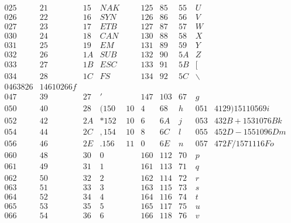 $$\begin{array}{|lllll||llll|l}
       025&   21&    15&    NAK&     &       125&   85&    55&    U& \\
       026&   22&    16&    SYN&     &       126&   86&    56&    V& \\
       027&   23&    17&    ETB&     &       127&   87&    57&    W& \\
       030&   24&    18&    CAN&     &       130&   88&    58&    X& \\
       031&   25&    19&    EM&     &        131&   89&    59&    Y& \\
       032&   26&    1A&    SUB&     &       132&   90&    5A&    Z& \\
       033&   27&    1B&    ESC&     &       133&   91&    5B&    [ \\
       034&   28&     1C&    FS&     &        134&   92&    5C&    \backslash \\
	\hline
       046    38     26    &              146   102   66    f \\
       047&   39&    27&    '&     &         147&   103&   67&    g& \\
       050&   40&    28&    (              150&   10&4&   68&    h&
       051&   41    29    )              151   105   69    i \\
       052&   42&    2A&    *              152&   10&6&   6A&    j&
       053&   43    2B    +              153   107   6B    k \\
       054&   44&    2C&    ,              154&   10&8&   6C&    l&
       055&   45    2D    -              155   109   6D    m \\
       056&   46&    2E&    .              156&   11&0&   6E&    n&
       057&   47    2F    /              157   111   6F    o \\
       060&   48&    30&    0&     &         160&   112&   70&    p& \\
       061&   49&    31&    1&     &         161&   113&   71&    q& \\
       062&   50&    32&    2&     &         162&   114&   72&    r& \\
       063&   51&    33&    3&     &         163&   115&   73&    s& \\
       064&   52&    34&    4&     &         164&   116&   74&    t& \\
       065&   53&    35&    5&     &         165&   117&   75&    u& \\
       066&   54&    36&    6&     &         166&   118&   76&    v& \\

\end{array}$$
